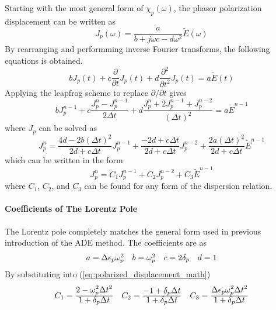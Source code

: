 Starting with the most general form of $\chi_p(\omega)$, the phasor polarization displacement can be written
as
\begin{equation}
  J_p(\omega) = \frac{a}{b + j\omega c - d\omega^2}\widetilde{E}(\omega)
\end{equation}
By rearranging and performming inverse Fourier transforms, the following equations is obtained.
\begin{equation}
  bJ_p(t) + c \frac{\partial}{\partial t}J_p(t) + d \frac{\partial ^2}{\partial t^2}J_p(t) = a\widetilde{E}(t)
\end{equation}
Applying the leapfrog scheme to replace $\partial/\partial t$ gives
\begin{equation}
  bJ_p^{n-1} + c \frac{J_p^n - J_p^{n-1}}{2\Delta t} + d \frac{J_p^n + 2J_p^{n-1} + J_p^{n-2}}{(\Delta t)^2} = a\widetilde{E}^{n-1}
\end{equation}
where $J_p$ can be solved as 
\begin{equation}\label{eq:polarized_displacement_math}
  J_p^n = \frac{4d-2b(\Delta t)^2}{2d+c\Delta t}J_p^{n-1} + \frac{-2d+c\Delta t}{2d+c\Delta t}J_p^{n-2} + \frac{2a(\Delta t)^2}{2d+c\Delta t}\widetilde{E}^{n-1}
\end{equation}
which can be written in the form 
\begin{equation}\label{eq:polarized_displacement}
  J_p^n = C_1 J_p^{n-1} + C_2 J_p^{n-2} + C_3 \widetilde{E}^{n-1}
\end{equation}
where $C_1$, $C_2$, and $C_3$ can be found for any form of the dispersion relation.


\paragraph{\msjh Coefficients of The Lorentz Pole}
The Lorentz pole completely matches the general form used in previous introduction of the ADE method. The coefficients
are as 
\begin{equation*}
  \begin{array}{@{}llll@{}}
    a = \Delta\epsilon_p\omega_p^2 &
    b = \omega_p^2 &
    c = 2\delta_p &
    d = 1
  \end{array}
\end{equation*}
By substituting into (\ref{eq:polarized_displacement_math})
\begin{gather*}
  \begin{array}{@{}lll@{}}
    C_1 = \frac{\displaystyle 2-\omega_p^2\Delta t^2}{\displaystyle 1+\delta_p\Delta t} &
    C_2 = \frac{\displaystyle -1 + \delta_p\Delta t}{\displaystyle 1+\delta_p\Delta t} &
    C_3 = \frac{\displaystyle \Delta\epsilon_p\omega_p^2\Delta t^2}{\displaystyle 1+\delta_p\Delta t}
  \end{array}
\end{gather*}


